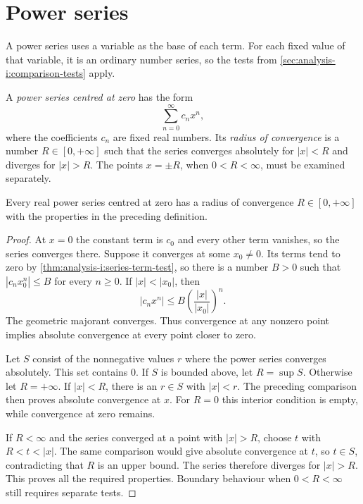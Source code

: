 \section{Power series}
\label{sec:analysis-i:power-series}

A power series uses a variable as the base of each term. For each fixed
value of that variable, it is an ordinary number series, so the tests
from \autoref{sec:analysis-i:comparison-tests} apply.

\begin{definition}
  A \emph{power series centred at zero} has the form
  \[
    \sum_{n=0}^{\infty}c_nx^n,
  \]
  where the coefficients $c_n$ are fixed real numbers.
  Its \emph{radius of convergence} is a number $R\in[0,+\infty]$
  such that the series converges absolutely for $|x|<R$ and diverges
  for $|x|>R$. The points $x=\pm R$, when $0<R<\infty$, must be
  examined separately.
\end{definition}


\begin{proposition}
  \label{thm:analysis-i:power-series-radius}
  Every real power series centred at zero has a radius of convergence
  $R\in[0,+\infty]$ with the properties in the preceding definition.
\end{proposition}

\begin{proof}
  At $x=0$ the constant term is $c_0$ and every other term vanishes,
  so the series converges there. Suppose it converges at some
  $x_0\ne0$. Its terms tend to zero by
  \autoref{thm:analysis-i:series-term-test}, so there is a number $B>0$
  such that $|c_nx_0^n|\le B$ for every $n\ge0$. If $|x|<|x_0|$, then
  \[
    |c_nx^n|\le B\left(\frac{|x|}{|x_0|}\right)^n.
  \]
  The geometric majorant converges. Thus convergence at any nonzero
  point implies absolute convergence at every point closer to zero.

  Let $S$ consist of the nonnegative values $r$ where the power series
  converges absolutely. This set contains $0$.
  If $S$ is bounded above, let $R=\sup S$. Otherwise let $R=+\infty$.
  If $|x|<R$, there is an $r\in S$ with $|x|<r$. The preceding
  comparison then proves absolute convergence at $x$. For $R=0$
  this interior condition is empty, while convergence at zero remains.

  If $R<\infty$ and the series converged at a point with $|x|>R$,
  choose $t$ with $R<t<|x|$. The same comparison would give absolute
  convergence at $t$, so $t\in S$, contradicting that $R$ is an upper
  bound. The series therefore diverges for $|x|>R$. This proves all
  the required properties. Boundary behaviour when $0<R<\infty$
  still requires separate tests.
\end{proof}


